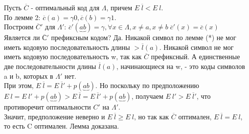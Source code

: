 Пусть $\overline{C}$ - оптимальный код для $\Lambda$, причем $E \: \overline{l} < E \: l$.\\
По лемме 2: $\overline{c}(a) = \gamma0, \overline{c}(b) = \gamma1$.\\
Построим $\overline{C}'$ для $\Lambda'$: $\overline{c}'(\underbrace{ab}) = \gamma, \forall x \in \Lambda, x \not= a, x \not= b \; \overline{c}'(x) = \overline{c}(x)$\\
Является ли $\overline{С}'$ префиксным кодом? Да. Никакой символ по лемме (*) не мог иметь кодовую последовательность длины $> \overline{l}(a)$. Никакой символ не мог иметь кодовую последовательность w, так как $\overline{C}$ префиксный. А единственные две последовательности длины $\overline{l}(a)$, начинающиеся на w, - это коды символов a и b, которых в $\Lambda'$ нет. \\
При этом, $E \: \overline{l} = E \: \overline{l}' + p(\underbrace{ab})$. Но поскольку по предположению $E \: l = E \: l' + p(\underbrace{ab}) > E \: \overline{l} = E \: \overline{l}' + p(\underbrace{ab})$, получаем $E \: l' > E \: \overline{l}'$, что противоречит оптимальности $C'$ на $\Lambda'$.\\
Значит, предположение неверно и $E \: \overline{l} \geq E \: l$, но так как $\overline{C}$ оптимален, $E \: \overline{l} = E \: l$, то есть C оптимален. Лемма доказана.
